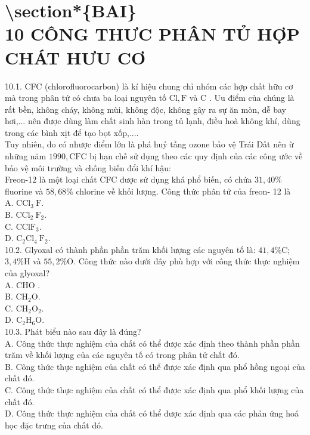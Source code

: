 \documentclass[10pt]{article}
\begin{document}
\section*{\textbackslash section*\{BAI\} \\
 10 CÔNG THƯC PHÂN TỦ HỢP CHÁT HƯU CƠ}
10.1. CFC (chlorofluorocarbon) là kí hiệu chung chỉ nhóm các hợp chất hữu cơ mà trong phân tứ có chưa ba loại nguyên tố $\mathrm{Cl}, \mathrm{F}$ và C . Uu điểm của chúng là rất bền, không cháy, không mùi, không độc, không gây ra sự ăn mòn, dễ bay hơi,... nên được dùng làm chất sinh hàn trong tủ lạnh, điều hoà không khí, dùng trong các bình xịt để tạo bọt xốp,....\\
Tuy nhiên, do có nhược điểm lớn là phá huỷ tầng ozone bảo vệ Trái Dất nên ừ những năm $1990, \mathrm{CFC}$ bị hạn chế sử dụng theo các quy định của các công ước về bảo vệ môi trường và chống biến đổi khí hậu:\\
Freon-12 là một loại chất CFC được sứ dụng khá phổ biến, có chứa $31,40 \%$ fluorine và $58,68 \%$ chlorine về khối lượng. Công thức phân tử của freon- 12 là\\
A. $\mathrm{CCl}_{3} \mathrm{~F}$.\\
B. $\mathrm{CCl}_{2} \mathrm{~F}_{2}$.\\
C. $\mathrm{CClF}_{3}$.\\
D. $\mathrm{C}_{2} \mathrm{Cl}_{4} \mathrm{~F}_{2}$.\\
10.2. Glyoxal có thành phần phần trăm khối lượng các nguyên tố là: $41,4 \% \mathrm{C}$; $3,4 \% \mathrm{H}$ và $55,2 \% \mathrm{O}$. Công thức nào dưới đây phù hợp với công thức thực nghiệm của glyoxal?\\
A. CHO .\\
B. $\mathrm{CH}_{2} \mathrm{O}$.\\
C. $\mathrm{CH}_{2} \mathrm{O}_{2}$.\\
D. $\mathrm{C}_{2} \mathrm{H}_{6} \mathrm{O}$.\\
10.3. Phát biểu nào sau đây là đúng?\\
A. Công thức thực nghiệm của chất có thể được xác định theo thành phần phần trăm về khối lượng của các nguyên tố có trong phân tử chất đó.\\
B. Công thức thực nghiệm của chất có thể được xác định qua phổ hồng ngoại của chất đó.\\
C. Công thức thực nghiệm của chất có thể được xác định qua phổ khối lượng của chất đó.\\
D. Công thức thực nghiệm của chất có thể được xác định qua các phản ứng hoá học đặc trưng của chất đó.\\
\end{document}

